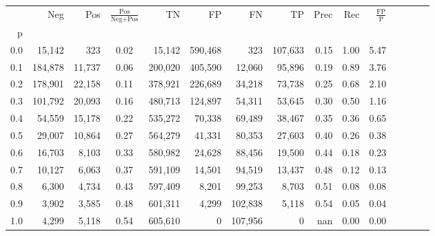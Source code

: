 \begin{tabular}{rrrcrrrrrrrrrrr}
\toprule
{} &      Neg &     Pos & $\frac{\text{Pos}}{\text{Neg}+\text{Pos}}$ &       TN &       FP &       FN &       TP &  Prec &   Rec & $\frac{\text{FP}}{\text{P}}$ \\
p   &          &         &                                            &          &          &          &          &       &       &                              \\
\midrule
0.0 &   15,142 &     323 &                                       0.02 &   15,142 &  590,468 &      323 &  107,633 &  0.15 &  1.00 &                         5.47 \\
0.1 &  184,878 &  11,737 &                                       0.06 &  200,020 &  405,590 &   12,060 &   95,896 &  0.19 &  0.89 &                         3.76 \\
0.2 &  178,901 &  22,158 &                                       0.11 &  378,921 &  226,689 &   34,218 &   73,738 &  0.25 &  0.68 &                         2.10 \\
0.3 &  101,792 &  20,093 &                                       0.16 &  480,713 &  124,897 &   54,311 &   53,645 &  0.30 &  0.50 &                         1.16 \\
0.4 &   54,559 &  15,178 &                                       0.22 &  535,272 &   70,338 &   69,489 &   38,467 &  0.35 &  0.36 &                         0.65 \\
0.5 &   29,007 &  10,864 &                                       0.27 &  564,279 &   41,331 &   80,353 &   27,603 &  0.40 &  0.26 &                         0.38 \\
0.6 &   16,703 &   8,103 &                                       0.33 &  580,982 &   24,628 &   88,456 &   19,500 &  0.44 &  0.18 &                         0.23 \\
0.7 &   10,127 &   6,063 &                                       0.37 &  591,109 &   14,501 &   94,519 &   13,437 &  0.48 &  0.12 &                         0.13 \\
0.8 &    6,300 &   4,734 &                                       0.43 &  597,409 &    8,201 &   99,253 &    8,703 &  0.51 &  0.08 &                         0.08 \\
0.9 &    3,902 &   3,585 &                                       0.48 &  601,311 &    4,299 &  102,838 &    5,118 &  0.54 &  0.05 &                         0.04 \\
1.0 &    4,299 &   5,118 &                                       0.54 &  605,610 &        0 &  107,956 &        0 &   nan &  0.00 &                         0.00 \\
\bottomrule
\end{tabular}
